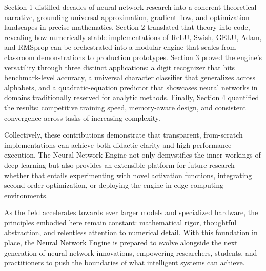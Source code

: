 \documentclass[11pt,a4paper]{report}
\begin{document}
Section 1 distilled decades of neural-network research into a coherent theoretical narrative, grounding universal approximation, gradient flow, and optimization landscapes in precise mathematics. Section 2 translated that theory into code, revealing how numerically stable implementations of ReLU, Swish, GELU, Adam, and RMSprop can be orchestrated into a modular engine that scales from classroom demonstrations to production prototypes. Section 3 proved the engine's versatility through three distinct applications: a digit recognizer that hits benchmark-level accuracy, a universal character classifier that generalizes across alphabets, and a quadratic-equation predictor that showcases neural networks in domains traditionally reserved for analytic methods. Finally, Section 4 quantified the results: competitive training speed, memory-aware design, and consistent convergence across tasks of increasing complexity.

Collectively, these contributions demonstrate that transparent, from-scratch implementations can achieve both didactic clarity and high-performance execution. The Neural Network Engine not only demystifies the inner workings of deep learning but also provides an extensible platform for future research—whether that entails experimenting with novel activation functions, integrating second-order optimization, or deploying the engine in edge-computing environments.

As the field accelerates towards ever larger models and specialized hardware, the principles embodied here remain constant: mathematical rigor, thoughtful abstraction, and relentless attention to numerical detail. With this foundation in place, the Neural Network Engine is prepared to evolve alongside the next generation of neural-network innovations, empowering researchers, students, and practitioners to push the boundaries of what intelligent systems can achieve.
\end{document}
